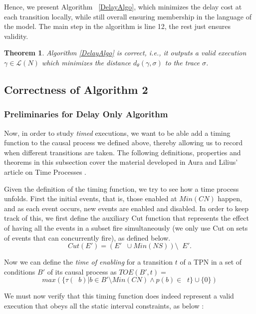 \documentclass[conference]{IEEEtran}
\DeclareMathOperator*{\pre}{^\bullet}
\newtheorem{theorem}{Theorem}
\begin{document}
		Hence, we present Algorithm ~\ref{DelayAlgo}, which minimizes the delay cost at each transition locally, while still overall ensuring membership in the language of the model. The main step in the algorithm is line 12, the rest just ensures validity. 
		
		\begin{theorem}\label{DelayAlgoCorr} Algorithm \ref{DelayAlgo} is correct, i.e., it outputs a valid execution
			$\gamma \in \mathcal{L}(N)$ which minimizes the distance $d_\theta(\gamma, \sigma)$
			to the trace $\sigma$.
		\end{theorem}

	
			

	
		\subsection{Correctness of Algorithm 2} 
			\subsubsection{Preliminaries for Delay Only Algorithm} 
	
	
	Now, in order to study \textit{timed} executions, we want to be able add a timing function to the causal process we defined above, thereby allowing us to record when different transitions are taken. 
	The following definitions, properties and theorems in this subsection cover the material developed in Aura and Lilius' article on Time Processes \cite{AL97}. 
	
	Given the definition of the timing function, we try to see how a time process unfolds. 
	First the initial events, that is, those enabled at $Min(CN)$ happen, and as each event occurs, new events are enabled and disabled. 
	In order to keep track of this, we first define the auxiliary Cut function that represents the effect of having all the events in a subset fire simultaneously (we only use Cut on sets of events that can concurrently fire), as defined below. 
	$$Cut(E') = (E' \pre  \cup Min(NS)) \setminus \pre  E'.$$
	
	Now we can define the  \textit{time of enabling} for a transition $t$ of a TPN in a set of conditions $B'$ of its causal process as $TOE(B', t) = $ $$ max(\{\tau(\pre b) | b \in B' \setminus Min(CN) \wedge p(b) \in \pre  t\} \cup \{0\})$$
	
	We must now verify that this timing function does indeed represent a valid execution that obeys all the static interval constraints, as below : 
	
\end{document}

